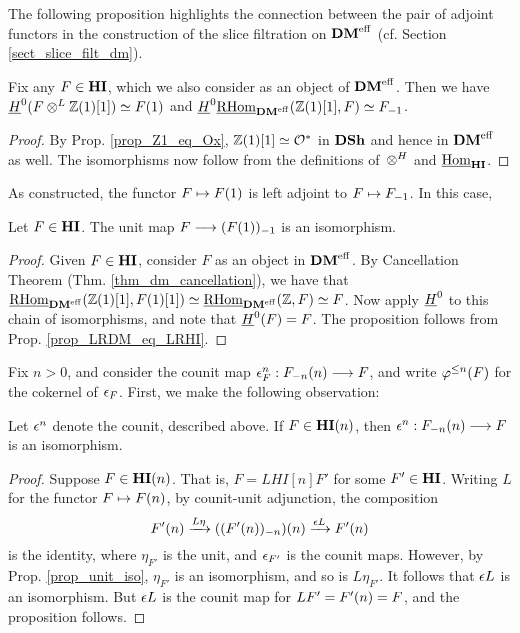 The following proposition highlights the connection between the
pair of adjoint functors in the construction of the slice 
filtration on $\DMeff$ (cf.  Section \ref{sect_slice_filt_dm}).

\begin{prop}\label{prop_LRDM_eq_LRHI}
Fix any $F \in \HI$, which we also consider as an object of 
$\DMeff$. Then we have $\sheaf{H}^0(F \tDM \Z(1)[1]) \simeq 
\LHI{F}$ and $\sheaf{H}^0\ihomDMf(\Z(1)[1], F) \simeq \RHI{F}$.
\end{prop}
\begin{proof}
By Prop. \ref{prop_Z1_eq_Ox}, $\Z(1)[1] \simeq \Ox$ in $\DSh$
and hence in $\DMeff$ as well. The isomorphisms now follow
from the definitions of $\tHI$ and $\ihomHI$.
\end{proof}

As constructed, the functor $F \mapsto \LHI{F}$ is left adjoint to 
$F \mapsto \RHI{F}$. In this case,

\begin{prop}\label{prop_unit_iso}
Let $F \in \HI$. The unit map $F \to \RHI{(\LHI{F})}$ is an
isomorphism.
\end{prop}
\begin{proof}
Given $F \in \HI$, consider $F$ as an object in $\DMeff$. By
Cancellation Theorem (Thm. \ref{thm_dm_cancellation}), we have
that $\ihomDMf(\Z(1)[1], F(1)[1]) \simeq \ihomDMf(\Z, F) 
\simeq F$. Now apply $\sheaf{H}^0$ to this chain of isomorphisms,
and note that $\sheaf{H}^0(F) = F$. The proposition follows from 
Prop. \ref{prop_LRDM_eq_LRHI}.
\end{proof}

Fix $n > 0$, and consider the counit map $\cuHI_F^n: 
\LHI[n]{\RHI[n]{F}} \to F$, and write $\tlHI{n}(F)$ for the 
cokernel of $\cuHI_F$. First, we make the following observation:

\begin{prop}\label{prop_counit_iso_for_HIn}
Let $\cuHI^n$ denote the counit, described above. If $F \in 
\LHI[n]{\HI}$, then $\cuHI^n : \LHI[n]{\RHI[n]{F}} \to F$ is
an isomorphism.
\end{prop}
\begin{proof}
Suppose $F \in \LHI[n]{\HI}$. That is, $F = LHI[n]{F'}$ for some 
$F' \in \HI$. Writing $L$ for the functor $F \mapsto \LHI[n]F$, 
by counit-unit adjunction, the composition
\[
\LHI[n]{F'} \xrightarrow{L\eta} \LHI[n]{(\RHI[n]{(\LHI[n]{F'})})}
   \xrightarrow{\cuHI L} \LHI[n]{F'}
\]
is the identity, where $\eta_{F'}$ is the unit, and $\cuHI_{F'}$ 
is the counit maps. However, by Prop. \ref{prop_unit_iso}, 
$\eta_{F'}$ is an isomorphism, and so is $L\eta_{F'}$. It follows
that $\cuHI L$ is an isomorphism. But $\cuHI L$ is the counit
map for $LF' = \LHI[n]{F'} = F$, and the proposition follows.
\end{proof}

